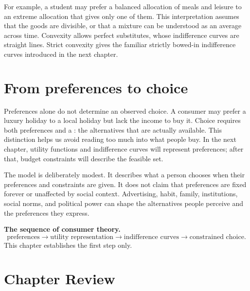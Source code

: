 For example, a student may prefer a balanced allocation of meals and leisure
to an extreme allocation that gives only one of them. This interpretation
assumes that the goods are divisible, or that a mixture can be understood as
an average across time. Convexity allows perfect substitutes, whose
indifference curves are straight lines. Strict convexity gives the familiar
strictly bowed-in indifference curves introduced in the next chapter.

\section{From preferences to choice}

Preferences alone do not determine an observed choice. A consumer may prefer
a luxury holiday to a local holiday but lack the income to buy it. Choice
requires both preferences and a : the alternatives that
are actually available. This distinction helps us avoid reading too much into
what people buy. In the next chapter, utility functions and indifference
curves will represent preferences; after that, budget constraints will
describe the feasible set.

The model is deliberately modest. It describes what a person chooses when
their preferences and constraints are given. It does not claim that
preferences are fixed forever or unaffected by social context. Advertising,
habit, family, institutions, social norms, and political power can shape the
alternatives people perceive and the preferences they express.

\begin{keyidea}
\textbf{The sequence of consumer theory.}
\[
\text{preferences}
\longrightarrow
\text{utility representation}
\longrightarrow
\text{indifference curves}
\longrightarrow
\text{constrained choice}.
\]
This chapter establishes the first step only.
\end{keyidea}

\section*{Chapter Review}

